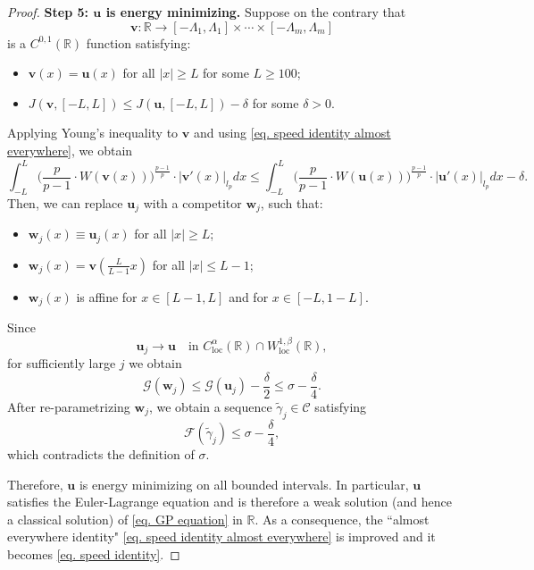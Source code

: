 \documentclass[11pt,twoside,reqno]{amsart}
\numberwithin{equation}{section}
\begin{document}
\begin{proof}
    \textbf{Step 5: $\mathbf{u}$ is energy minimizing.} Suppose on the contrary that $$\mathbf{v}:\mathbb{R}\to[-\Lambda_{1},\Lambda_{1}]\times\cdots\times[-\Lambda_{m},\Lambda_{m}]$$ is a $C^{0,1}(\mathbb{R})$ function satisfying:
    \begin{itemize}
        \item $\mathbf{v}(x)=\mathbf{u}(x)$ for all $|x|\geq L$ for some $L\geq100$;
        \item $J(\mathbf{v},[-L,L])\leq J(\mathbf{u},[-L,L])-\delta$ for some $\delta>0$.
    \end{itemize}
    Applying Young's inequality to $\mathbf{v}$ and using \eqref{eq. speed identity almost everywhere}, we obtain
    \begin{equation*}
        \int_{-L}^{L}\Big(\frac{p}{p-1}\cdot W(\mathbf{v}(x))\Big)^{\frac{p-1}{p}}\cdot|\mathbf{v}'(x)|_{l_{p}}dx\leq\int_{-L}^{L}\Big(\frac{p}{p-1}\cdot W(\mathbf{u}(x))\Big)^{\frac{p-1}{p}}\cdot|\mathbf{u}'(x)|_{l_{p}}dx-\delta.
    \end{equation*}
    Then, we can replace $\mathbf{u}_{j}$ with a competitor $\mathbf{w}_{j}$, such that:
    \begin{itemize}
        \item $\mathbf{w}_{j}(x)\equiv\mathbf{u}_{j}(x)$ for all $|x|\geq L$;
        \item $\mathbf{w}_{j}(x)=\mathbf{v}(\frac{L}{L-1}x)$ for all $|x|\leq L-1$;
        \item $\mathbf{w}_{j}(x)$ is affine for $x\in[L-1,L]$ and for $x\in[-L,1-L]$.
    \end{itemize}

Since
\[
\mathbf u_j\to\mathbf u
\quad\mbox{in }
C^\alpha_{\mathrm{loc}}(\mathbb R)
\cap
W^{1,\beta}_{\mathrm{loc}}(\mathbb R),
\]
for sufficiently large $j$ we obtain
\begin{equation*}
    \mathcal{G}(\mathbf w_j)
    \leq
    \mathcal{G}(\mathbf u_j)-\frac{\delta}{2}
    \leq
    \sigma-\frac{\delta}{4}.
\end{equation*}
After re-parametrizing $\mathbf w_j$, we obtain a sequence
$\widetilde{\gamma}_j\in\mathcal C$ satisfying
\[
    \mathcal{F}(\widetilde{\gamma}_j)
    \leq
    \sigma-\frac{\delta}{4},
\]
which contradicts the definition of $\sigma$.

Therefore, $\mathbf u$ is energy minimizing on all bounded intervals.
In particular, $\mathbf u$ satisfies the Euler-Lagrange equation and is
therefore a weak solution (and hence a classical solution) of
\eqref{eq. GP equation} in $\mathbb R$. As a consequence,  the ``almost everywhere identity" \eqref{eq. speed identity almost everywhere} is improved and it becomes \eqref{eq. speed identity}.


\end{proof}
\end{document}
